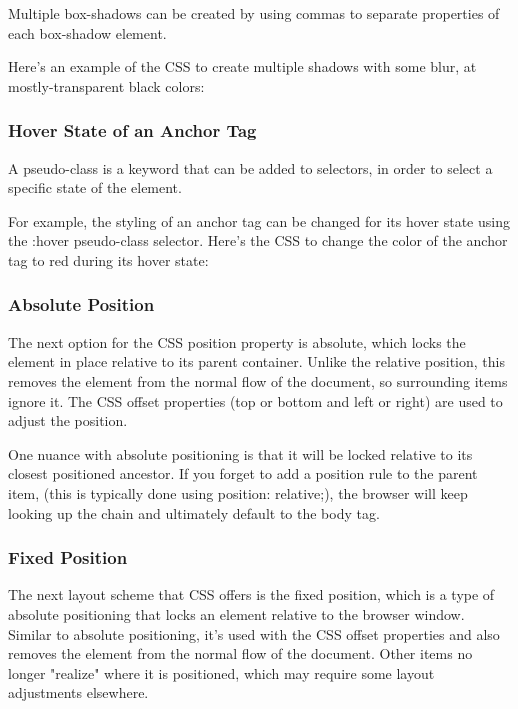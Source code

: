 Multiple box-shadows can be created by using commas to separate properties of each box-shadow element.

Here's an example of the CSS to create multiple shadows with some blur, at mostly-transparent black colors:


\subsubsection{Hover State of an Anchor Tag}
A pseudo-class is a keyword that can be added to selectors, in order to select a specific state of the element.

For example, the styling of an anchor tag can be changed for its hover state using the :hover pseudo-class selector. Here's the CSS to change the color of the anchor tag to red during its hover state:


\subsubsection{Absolute Position}


The next option for the CSS position property is absolute, which locks the element in place relative to its parent container. Unlike the relative position, this removes the element from the normal flow of the document, so surrounding items ignore it. The CSS offset properties (top or bottom and left or right) are used to adjust the position.

One nuance with absolute positioning is that it will be locked relative to its closest positioned ancestor. If you forget to add a position rule to the parent item, (this is typically done using position: relative;), the browser will keep looking up the chain and ultimately default to the body tag.

\subsubsection{Fixed Position}


The next layout scheme that CSS offers is the fixed position, which is a type of absolute positioning that locks an element relative to the browser window. Similar to absolute positioning, it's used with the CSS offset properties and also removes the element from the normal flow of the document. Other items no longer "realize" where it is positioned, which may require some layout adjustments elsewhere.

